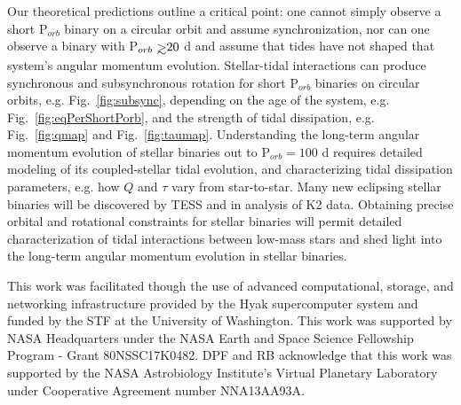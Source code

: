 \documentclass[twocolumn]{aastex61}
\def\gsim{~\rlap{$>$}{\lower 1.0ex\hbox{$\sim$}}}
\begin{document}
Our theoretical predictions outline a critical point: one cannot simply observe a short P$_{orb}$ binary on a circular orbit and assume synchronization, nor can one observe a binary with P$_{orb} \gsim 20$ d and assume that tides have not shaped that system's angular momentum evolution.  Stellar-tidal interactions can produce synchronous and subsynchronous rotation for short P$_{orb}$ binaries on circular orbits, e.g. Fig.~\ref{fig:subsync}, depending on the age of the system, e.g. Fig.~\ref{fig:eqPerShortPorb}, and the strength of tidal dissipation, e.g. Fig.~\ref{fig:qmap} and Fig.~\ref{fig:taumap}.  Understanding the long-term angular momentum evolution of stellar binaries out to P$_{orb} = 100$ d requires detailed modeling of its coupled-stellar tidal evolution, and characterizing tidal dissipation parameters, e.g. how $Q$ and $\tau$ vary from star-to-star. Many new eclipsing stellar binaries will be discovered by TESS \citep[e.g.][]{Sullivan2015,Matson2018} and in analysis of K2 data.  Obtaining precise orbital and rotational constraints for stellar binaries will permit detailed characterization of tidal interactions between low-mass stars and shed light into the long-term angular momentum evolution in stellar binaries. 

\acknowledgments
This work was facilitated though the use of advanced computational, storage, and networking infrastructure provided by the Hyak supercomputer system and funded by the STF at the University of Washington. This work was supported by NASA Headquarters under the NASA Earth and Space Science Fellowship Program - Grant 80NSSC17K0482.  DPF and RB acknowledge that this work was supported by the NASA Astrobiology Institute's Virtual Planetary Laboratory under Cooperative Agreement number NNA13AA93A.



\end{document}
